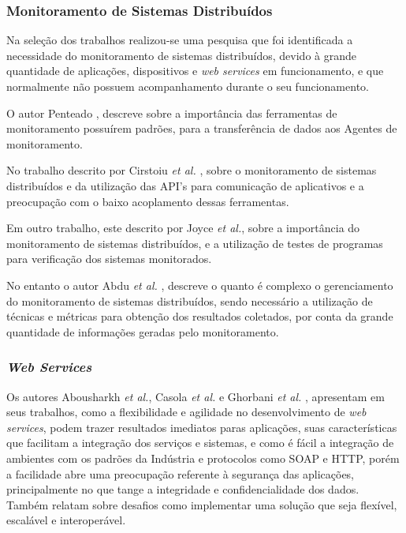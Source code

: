 \subsubsection{Monitoramento de Sistemas Distribuídos}
Na seleção dos trabalhos realizou-se uma pesquisa que foi identificada a necessidade do monitoramento de sistemas distribuídos, devido à grande quantidade de  aplicações, dispositivos e \textit{web services} em funcionamento, e que normalmente não possuem acompanhamento durante o seu funcionamento. 

O autor Penteado \cite{penteado2012jmonitor}, descreve sobre a importância das ferramentas de monitoramento possuírem padrões, para a transferência de dados aos Agentes de monitoramento. 

No trabalho descrito por Cirstoiu \textit{et al.} \cite{cirstoiu2007monitoring},  sobre o monitoramento de sistemas distribuídos e da utilização das API's para comunicação de aplicativos e a preocupação com o baixo acoplamento dessas ferramentas. 

Em outro trabalho,  este descrito por Joyce \textit{et al.}\cite{joyce1987monitoring}, sobre a importância do monitoramento de sistemas distribuídos, e a utilização de testes de programas para verificação dos sistemas monitorados. 

No entanto o autor Abdu \textit{et al.} \cite{abdu1995investigation}, descreve o quanto é complexo o gerenciamento do monitoramento de sistemas distribuídos, sendo necessário a utilização de técnicas e métricas para obtenção dos resultados coletados, por conta da grande quantidade de informações geradas pelo monitoramento.  

\subsubsection{\textit{Web Services}}

Os autores Abousharkh \textit{et al.}, Casola \textit{et al.} e Ghorbani \textit{et al.} \cite{abousharkh2011service,casola2009sensim,ghorbani2013personal}, apresentam em seus trabalhos, como a flexibilidade e agilidade no desenvolvimento de \textit{web services}, podem trazer resultados imediatos paras aplicações, suas características que facilitam a integração dos serviços e sistemas, e como é fácil a integração de ambientes com os padrões da Indústria e protocolos como SOAP e HTTP, porém a facilidade abre uma preocupação referente à segurança das aplicações, principalmente no que tange a integridade e confidencialidade dos dados.  Também relatam sobre desafios como implementar uma solução que seja flexível, escalável e interoperável.  

